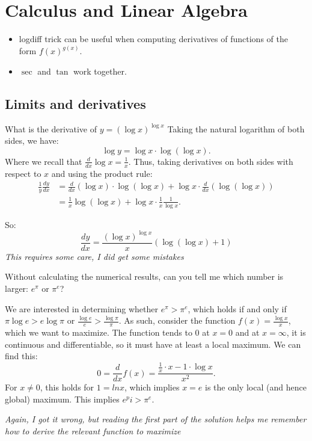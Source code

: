 \section{Calculus and Linear Algebra}

\begin{itemize}
    \item logdiff trick can be useful when computing derivatives of functions of the form $f(x)^{g(x)}$.
    \item $\sec$ and $\tan$ work together.
\end{itemize}


\subsection{Limits and derivatives}

\begin{qanda}
    \Q
    What is the derivative of $y = (\log x)^{\log x}$
    \A 
    Taking the natural logarithm of both sides, we have:
    \[
        \log y = \log x \cdot  \log (\log x ).
    \]
    Where we recall that $\frac{d}{dx} \log x = \frac{1}{x}$. Thus, taking derivatives on both sides with respect to $x$ and using the product rule:
    \begin{align*}
        \frac{1}{y} \frac{dy}{dx} 
        &=
        \frac{d}{dx}(\log x) \cdot \log (\log x) + \log x \cdot \frac{d}{dx}(\log (\log x)) \\
        &= \frac{1}{x} \log ( \log x) + \log x \cdot \frac{1}{x} \frac{1}{\log x}.
    \end{align*}

    So:
    \[
        \frac{dy}{dx} = \frac{(\log x)^{\log x}}{x} 
        \left( \log ( \log x) + 1 \right)
    \]
    \emph{This requires some care, I did get some mistakes}
\end{qanda}



\begin{qanda}
    \Q
    Without calculating the numerical results, can you tell me which number is larger: $e^{\pi}$ or $\pi^{e}$?

    \A
    We are interested in determining whether $e^\pi > \pi^e$, which holds if and only if $\pi \log e > e \log \pi$ or $\frac{\log e}{e} > \frac{\log \pi}{\pi}$.
    As such, consider the function $f(x) = \frac{\log x }{x}$, which we want to maximize. The function tends to 0 at $x=0$ and at $x = \infty$, it is continuous and differentiable, so it must have at least a local maximum.
    We can find this:
    \[
        0 = \frac{d}{dx} f(x) = \frac{\frac{1}{x}\cdot x - 1\cdot \log x}{x^2}.
    \]
    For $x \neq 0$, this holds for $1 = ln x$, which implies $x=e$ is the only local (and hence global) maximum.
    This implies $e^pi > \pi^e$.

    \emph{Again, I got it wrong, but reading the first part of the solution helps me remember how to derive the relevant function to maximize}
\end{qanda}

